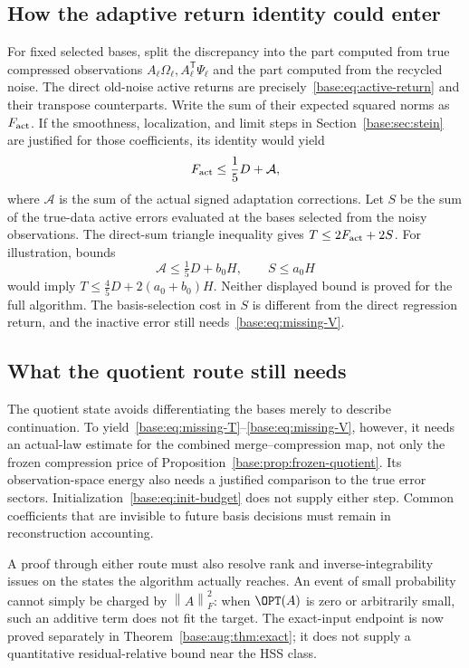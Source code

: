 \documentclass[11pt,oneside,openany,a4paper]{book}
\numberwithin{equation}{chapter}
\theoremstyle{definition}
\theoremstyle{remark}
\newcommand{\T}{\mathsf T}\newcommand{\Id}{I}
\newcommand{\F}[1]{\left\lVert#1\right\rVert_F}
\begin{document}
\subsection{How the adaptive return identity could enter}
For fixed selected bases, split the discrepancy into the part computed from
true compressed observations $A_\ell\Omega_\ell,A_\ell^{\T}\Psi_\ell$ and
the part computed from the recycled noise. The direct old-noise active
returns are precisely~\eqref{base:eq:active-return} and their transpose
counterparts. Write the sum of their expected squared norms as $F_{\rm act}$.
If the smoothness, localization, and limit steps in Section~\ref{base:sec:stein}
are justified for those coefficients, its identity would yield
\begin{equation}\label{base:eq:active-charge}
 F_{\rm act}\le\frac15D+\mathcal A,
\end{equation}
where $\mathcal A$ is the sum of the actual signed adaptation corrections.
Let $S$ be the sum of the true-data active errors evaluated at the bases
selected from the noisy observations. The direct-sum triangle inequality
gives $T\le2F_{\rm act}+2S$.
For illustration, bounds
\[
 \mathcal A\le\tfrac15D+b_0H,\qquad S\le a_0H
\]
would imply $T\le\tfrac45D+2(a_0+b_0)H$.
Neither displayed bound is proved for the full algorithm. The basis-selection
cost in $S$ is different from the direct regression return, and the inactive
error still needs~\eqref{base:eq:missing-V}.

\subsection{What the quotient route still needs}
The quotient state avoids differentiating the bases merely to describe
continuation. To yield~\eqref{base:eq:missing-T}--\eqref{base:eq:missing-V}, however,
it needs an actual-law estimate for the combined merge--compression map,
not only the frozen compression price of Proposition~\ref{base:prop:frozen-quotient}.
Its observation-space energy also needs a justified comparison to the true
error sectors. Initialization~\eqref{base:eq:init-budget} does not supply either
step. Common coefficients that are invisible to future basis decisions
must remain in reconstruction accounting.

A proof through either route must also resolve rank and inverse-integrability
issues on the states the algorithm actually reaches. An event of small
probability cannot simply be charged by $\F A^2$: when $\OPT(A)$ is zero or
arbitrarily small, such an additive term does not fit the target. The exact-input endpoint is now proved separately in
Theorem~\ref{base:aug:thm:exact}; it does not supply a quantitative
residual-relative bound near the HSS class.
\end{document}
